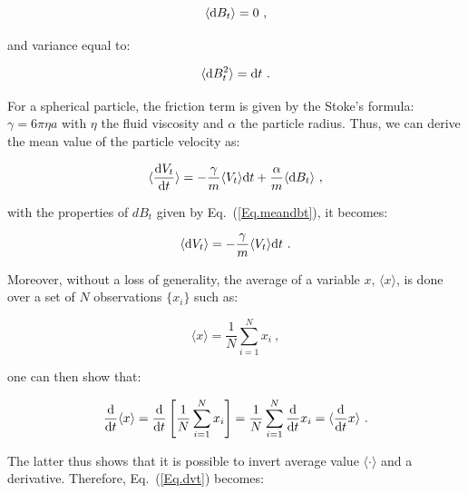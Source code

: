 \begin{equation}
	\langle \textnormal{d}B_t \rangle  = 0~,
	\label{Eq.meandbt}
\end{equation}

and variance equal to: 

\begin{equation}
	\langle \textnormal{d}B_t ^2 \rangle = \textnormal{d}t~.
	\label{Eq.meandbt2}
\end{equation}

For a spherical particle, the friction term is given by the Stoke's formula: $\gamma = 6\pi \eta a$ with $\eta$ the fluid viscosity and $\alpha$ the particle radius. Thus, we can derive the mean value of the particle velocity as:


\begin{equation}
	\langle  \frac{ \textnormal{d}V_t}{\textnormal{d}t} \rangle = - \frac{\gamma}{m} \langle V_t \rangle \textnormal{d}t  + \frac{\alpha}{m} \langle  \textnormal{d}B_t \rangle ~,
	\label{Eq.langevinsd}
\end{equation}

with the properties of $dB_t$ given by Eq.~(\ref{Eq.meandbt}), it becomes:

\begin{equation}
	\langle  \textnormal{d}V_t \rangle = - \frac{\gamma}{m} \langle V_t \rangle \textnormal{d}t ~.
	\label{Eq.dvt}
\end{equation}

Moreover, without a loss of generality, the average of a variable $x$, $\langle x \rangle$, is done over a set of $N$ observations $\{x_i\}$ such as:

\begin{equation}
	\langle x \rangle = \frac{1}{N} \sum _{i=1}^N x_i ~,
\end{equation}

one can then show that:

\begin{equation}
	\frac{\textnormal{d}}{\textnormal{d}t}\langle x \rangle = \frac{\textnormal{d}}{ \textnormal{d}t} \left[\frac{1}{N} \sum _{i=1}^N x_i \right] = 
	\frac{1}{N} \sum _{i=1}^N \frac{\textnormal{d}}{ \textnormal{d}t} x_i = \langle\frac{\textnormal{d}}{\textnormal{d}t} x \rangle ~.
\end{equation}

The latter thus shows that it is possible to invert average value $\langle \cdot \rangle$ and a derivative. Therefore, Eq.~(\ref{Eq.dvt}) becomes:

